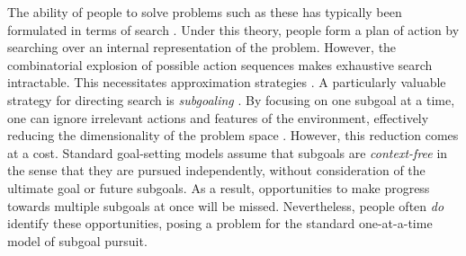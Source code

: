 \documentclass[10pt,letterpaper]{article}
\begin{document}


The ability of people to solve problems such as these has typically been formulated in terms of search \citep{NewellSimon1972}. Under this theory, people form a plan of action by searching over an internal representation of the problem. However, the combinatorial explosion of possible action sequences makes exhaustive search intractable. This necessitates approximation strategies \citep{Huys2015}. A particularly valuable strategy for directing search is \textit{subgoaling} \citep{Donnarumma2016}. By focusing on one subgoal at a time, one can ignore irrelevant actions and features of the environment, effectively reducing the dimensionality of the problem space \citep{Dietterich2000}. However, this reduction comes at a cost. Standard goal-setting models assume that subgoals are \textit{context-free} in the sense that they are pursued independently, without consideration of the ultimate goal or future subgoals. As a result, opportunities to make progress towards multiple subgoals at once will be missed. Nevertheless, people often \textit{do} identify these opportunities, posing a problem for the standard one-at-a-time model of subgoal pursuit.
\end{document}
